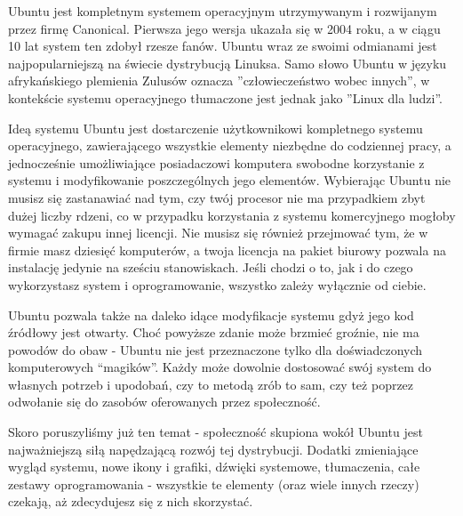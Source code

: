 Ubuntu jest kompletnym systemem operacyjnym utrzymywanym i rozwijanym przez firmę Canonical. Pierwsza jego wersja ukazała się w 2004 roku, a w ciągu 10 lat system ten zdobył rzesze fanów. Ubuntu wraz ze swoimi odmianami jest najpopularniejszą na świecie dystrybucją Linuksa. Samo słowo Ubuntu w języku afrykańskiego plemienia Zulusów oznacza ”człowieczeństwo wobec innych”, w kontekście systemu operacyjnego tłumaczone jest jednak jako ”Linux dla ludzi”.

Ideą systemu Ubuntu jest dostarczenie użytkownikowi kompletnego systemu operacyjnego, zawierającego wszystkie elementy niezbędne do codziennej pracy, a jednocześnie umożliwiające posiadaczowi komputera swobodne korzystanie z systemu i modyfikowanie poszczególnych jego elementów. Wybierając Ubuntu nie musisz się zastanawiać nad tym, czy twój procesor nie ma przypadkiem zbyt dużej liczby rdzeni, co w przypadku korzystania z systemu komercyjnego mogłoby wymagać zakupu innej licencji. Nie musisz się również przejmować tym, że w firmie masz dziesięć komputerów, a twoja licencja na pakiet biurowy pozwala na instalację jedynie na sześciu stanowiskach. Jeśli chodzi o to, jak i do czego wykorzystasz system i oprogramowanie, wszystko zależy wyłącznie od ciebie.

Ubuntu pozwala także na daleko idące modyfikacje systemu gdyż jego kod źródłowy jest otwarty. Choć powyższe zdanie może brzmieć groźnie, nie ma powodów do obaw - Ubuntu nie jest przeznaczone tylko dla doświadczonych komputerowych “magików”. Każdy może dowolnie dostosować swój system do własnych potrzeb i upodobań, czy to metodą zrób to sam, czy też poprzez odwołanie się do zasobów oferowanych przez społeczność.

Skoro poruszyliśmy już ten temat - społeczność skupiona wokół Ubuntu jest najważniejszą siłą napędzającą rozwój tej dystrybucji. Dodatki zmieniające wygląd systemu, nowe ikony i grafiki, dźwięki systemowe, tłumaczenia, całe zestawy oprogramowania - wszystkie te elementy (oraz wiele innych rzeczy) czekają, aż zdecydujesz się z nich skorzystać.
\clearpage
